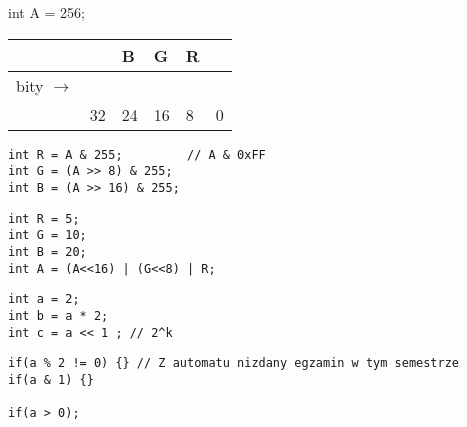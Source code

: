 \documentclass[11pt]{article}
\begin{document}
\hline

\begin{lang}
int A = 256;
\end{lang}

\begin{center}
\begin{tabular}{l|l|l|l|l|l|}
 &  & B & G & R & \\
\hline
bity \(\to\) &  &  &  &  & \\
\hline
 & 32 & 24 & 16 & 8 & 0\\
\end{tabular}
\end{center}

\begin{verbatim}
int R = A & 255;         // A & 0xFF
int G = (A >> 8) & 255;
int B = (A >> 16) & 255;
\end{verbatim}

\hline

\begin{verbatim}
int R = 5;
int G = 10;
int B = 20;
int A = (A<<16) | (G<<8) | R;
\end{verbatim}

\hline

\begin{verbatim}
int a = 2;
int b = a * 2;
int c = a << 1 ; // 2^k
\end{verbatim}

\hline

\begin{verbatim}
if(a % 2 != 0) {} // Z automatu nizdany egzamin w tym semestrze
if(a & 1) {}

if(a > 0);
\end{verbatim}
\end{document}
